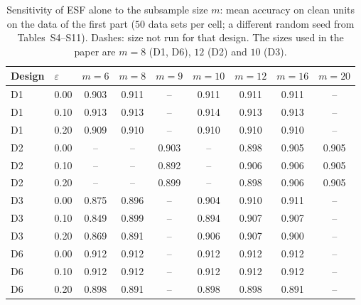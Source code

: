 \begin{table}[htbp]
\centering
\small
\caption{Sensitivity of ESF alone to the subsample size $m$: mean accuracy on clean units on the data of the first part ($50$ data sets per cell; a different random seed from Tables~S4--S11). Dashes: size not run for that design. The sizes used in the paper are $m=8$ (D1, D6), $12$ (D2) and $10$ (D3).}
\label{tab:S12}
\begin{tabular}{llccccccc}
\toprule
Design & $\varepsilon$ & $m=6$ & $m=8$ & $m=9$ & $m=10$ & $m=12$ & $m=16$ & $m=20$ \\
\midrule
D1 & 0.00 & 0.903 & 0.911 & -- & 0.911 & 0.911 & 0.911 & -- \\
D1 & 0.10 & 0.913 & 0.913 & -- & 0.914 & 0.913 & 0.913 & -- \\
D1 & 0.20 & 0.909 & 0.910 & -- & 0.910 & 0.910 & 0.910 & -- \\
D2 & 0.00 & -- & -- & 0.903 & -- & 0.898 & 0.905 & 0.905 \\
D2 & 0.10 & -- & -- & 0.892 & -- & 0.906 & 0.906 & 0.905 \\
D2 & 0.20 & -- & -- & 0.899 & -- & 0.898 & 0.906 & 0.905 \\
D3 & 0.00 & 0.875 & 0.896 & -- & 0.904 & 0.910 & 0.911 & -- \\
D3 & 0.10 & 0.849 & 0.899 & -- & 0.894 & 0.907 & 0.907 & -- \\
D3 & 0.20 & 0.869 & 0.891 & -- & 0.906 & 0.907 & 0.900 & -- \\
D6 & 0.00 & 0.912 & 0.912 & -- & 0.912 & 0.912 & 0.912 & -- \\
D6 & 0.10 & 0.912 & 0.912 & -- & 0.912 & 0.912 & 0.912 & -- \\
D6 & 0.20 & 0.898 & 0.891 & -- & 0.898 & 0.898 & 0.891 & -- \\
\bottomrule
\end{tabular}
\end{table}